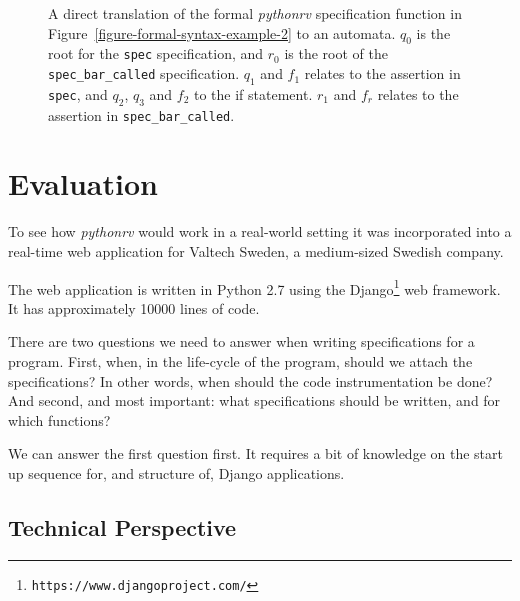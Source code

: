 \documentclass[a4paper,11pt]{kth-mag}
\begin{document}
\begin{figure}[h!]
\begin{minipage}{0.9\textwidth}
	\end{minipage}
  \caption{A direct translation of the formal \textit{pythonrv} specification
    function in Figure~\ref{figure-formal-syntax-example-2} to an automata.
    $q_0$ is the root for the \texttt{spec} specification, and $r_0$ is the
    root of the \texttt{spec\_bar\_called} specification. $q_1$ and $f_1$
    relates to the assertion in \texttt{spec}, and $q_2$, $q_3$ and $f_2$ to
    the if statement. $r_1$ and $f_r$ relates to the assertion in
    \texttt{spec\_bar\_called}.}
	\label{figure-formal-syntax-example-2-automata}
\end{figure}



\pagestyle{newchap}
\chapter{Evaluation} \label{chapter-evaluation}

To see how \textit{pythonrv} would work in a real-world setting it was
incorporated into a real-time web application for Valtech Sweden, a
medium-sized Swedish company.

The web application is written in Python 2.7 using the
Django\footnote{\texttt{https://www.djangoproject.com/}} web framework. It has
approximately 10000 lines of code.

There are two questions we need to answer when writing specifications for a
program. First, when, in the life-cycle of the program, should we attach the
specifications? In other words, when should the code instrumentation be done?
And second, and most important: what specifications should be written, and for
which functions?

We can answer the first question first. It requires a bit of knowledge on the
start up sequence for, and structure of, Django applications.


\section{Technical Perspective}
\end{document}
